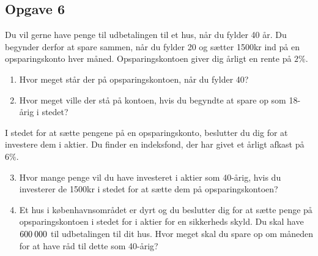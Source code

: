 \documentclass[12pt]{article}
\begin{document}
\subsection*{Opgave 6}
Du vil gerne have penge til udbetalingen til et hus, når du fylder 40 år. Du begynder derfor at spare sammen, når du fylder 20 og sætter 1500kr ind på en opsparingskonto hver måned. Opsparingskontoen giver dig årligt en rente på $2\%$.
\begin{enumerate}[label=\roman*)]
	\item Hvor meget står der på opsparingskontoen, når du fylder 40?
	\item Hvor meget ville der stå på kontoen, hvis du begyndte at spare op som 18-årig i stedet?
\end{enumerate}
I stedet for at sætte pengene på en opsparingskonto, beslutter du dig for at investere dem i aktier. Du finder en indeksfond, der har givet et årligt afkast på $6\%$. 
\begin{enumerate}[label=\roman*)]
	\setcounter{enumi}{2}
	\item Hvor mange penge vil du have investeret i aktier som 40-årig, hvis du investerer de 1500kr 
	i stedet for at sætte dem på opsparingskontoen?
	\item Et hus i københavnsområdet er dyrt og du beslutter dig for at sætte penge på opsparingskontoen i stedet for i aktier for en sikkerheds skyld. Du skal have $600\hspace{0.8mm} 000$ til udbetalingen til dit hus. Hvor meget skal du spare op om måneden for at have råd til dette som 40-årig?
\end{enumerate}
\end{document}
